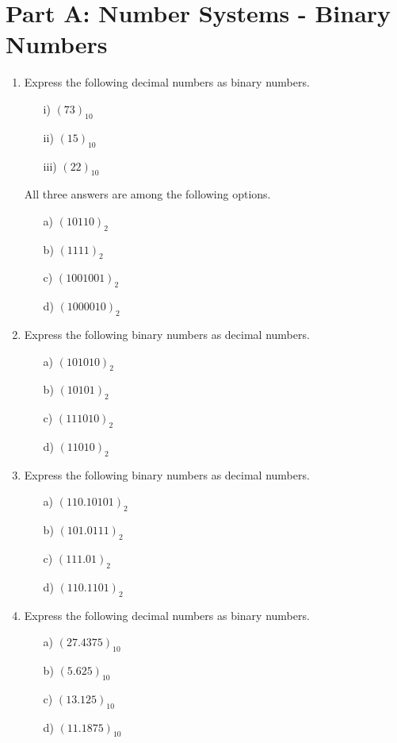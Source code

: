 \documentclass[]{report}
\begin{document}
\section*{Part A: Number Systems - Binary Numbers}
\begin{enumerate}
\item Express the following decimal numbers as binary numbers.
\begin{multicols}{4}
\begin{itemize}
\item[i)] $(73)_{10}$
\item[ii)] $(15)_{10}$
\item[iii)] $(22)_{10}$
\end{itemize}
\end{multicols}

All three answers are among the following options.
\begin{multicols}{4}
\begin{itemize}
\item[a)] $(10110)_{2}$ %
\item[b)] $(1111)_{2}$ %
\item[c)] $(1001001)_{2}$ %
\item[d)] $(1000010)_{2}$ %
\end{itemize}
\end{multicols}

\item Express the following binary numbers as decimal numbers.
\begin{multicols}{4}
\begin{itemize}
\item[a)] $(101010)_{2}$
\item[b)] $(10101)_{2}$
\item[c)] $(111010)_{2}$
\item[d)] $(11010)_{2}$
\end{itemize}
\end{multicols}
\item Express the following binary numbers as decimal numbers.
\begin{multicols}{4}
\begin{itemize}
\item[a)] $(110.10101)_{2}$
\item[b)] $(101.0111)_{2}$
\item[c)] $(111.01)_{2}$
\item[d)] $(110.1101)_{2}$
\end{itemize}
\end{multicols}
\item Express the following decimal numbers as binary numbers.
\begin{multicols}{4}
\begin{itemize}
\item[a)] $(27.4375)_{10}$  %
\item[b)] $(5.625)_{10}$
\item[c)] $(13.125)_{10}$
\item[d)] $(11.1875)_{10}$
\end{itemize}
\end{multicols}
\end{enumerate}
\end{document}
